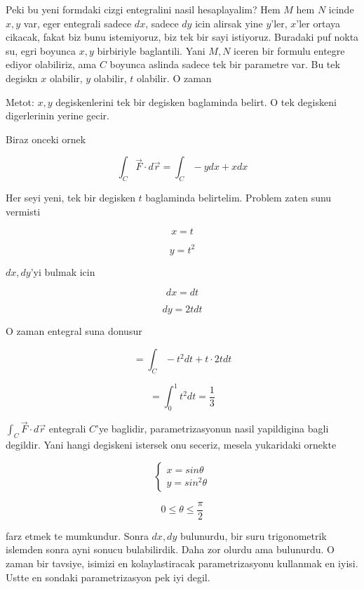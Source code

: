 \documentclass[12pt,fleqn]{article}
\begin{document}
Peki bu yeni formdaki cizgi entegralini nasil hesaplayalim? Hem $M$ hem $N$
icinde $x,y$ var, eger entegrali sadece $dx$, sadece $dy$ icin alirsak yine
$y$'ler, $x$'ler ortaya cikacak, fakat biz bunu istemiyoruz, biz tek bir
sayi istiyoruz. Buradaki puf nokta su, egri boyunca $x,y$ birbiriyle
baglantili. Yani $M,N$ iceren bir formulu entegre ediyor olabiliriz, ama
$C$ boyunca aslinda sadece tek bir parametre var. Bu tek degiskn $x$
olabilir, $y$ olabilir, $t$ olabilir. O zaman 

Metot: $x,y$ degiskenlerini tek bir degisken baglaminda belirt. O tek degiskeni
digerlerinin yerine gecir. 

Biraz onceki ornek

\[ \int_C \vec{F} \cdot d\vec{r} 
= \int_C -y dx + x dx
\]

Her seyi yeni, tek bir degisken $t$ baglaminda belirtelim. Problem zaten
sunu vermisti

\[ x = t  \]

\[ y = t^2 \]

$dx,dy$'yi bulmak icin

\[ dx = dt \]

\[ dy = 2tdt \]

O zaman entegral suna donusur

\[ = \int_C -t^2 dt + t \cdot 2t dt\]

\[ = \int_0^1 t^2 dt = \frac{1}{3}\]


$\int_C \vec{F} \cdot d\vec{r}$ entegrali $C$'ye baglidir, parametrizasyonun nasil 
yapildigina bagli degildir. Yani hangi degiskeni istersek onu seceriz,
mesela yukaridaki ornekte 

\[ 
\left\{ \begin{array}{l}
x  = sin\theta \\
y  = sin^2\theta 
\end{array} \right.
 \]

\[ 0 \le \theta \le \frac{\pi}{2} \]

farz etmek te mumkundur. Sonra $dx,dy$ bulunurdu, bir suru trigonometrik
islemden sonra ayni sonucu bulabilirdik. Daha zor olurdu ama bulunurdu. O
zaman bir tavsiye, isimizi en kolaylastiracak parametrizasyonu kullanmak en
iyisi. Ustte en sondaki parametrizasyon pek iyi degil. 
\end{document}
